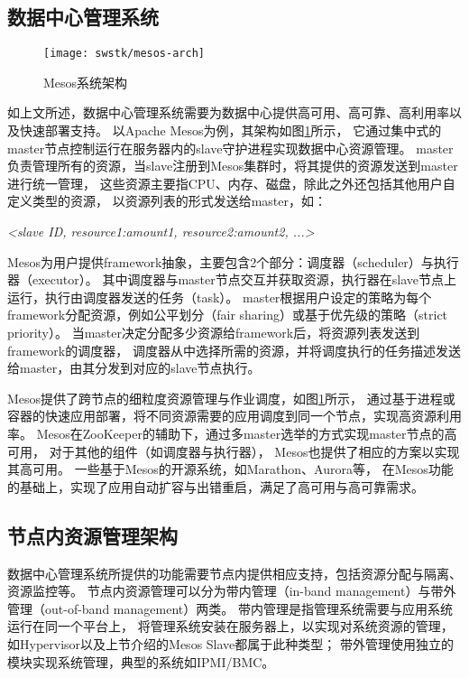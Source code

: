 \subsection{数据中心管理系统}

\begin{figure}[tb]
  \centering
  \texttt{[image: swstk/mesos-arch]}
  \caption{Mesos系统架构}
  \label{fig:mesos-arch}
\end{figure}

如上文所述，数据中心管理系统需要为数据中心提供高可用、高可靠、高利用率以及快速部署支持。
以Apache Mesos\cite{Hindman:2011:Mesos}为例，其架构如图\ref{fig:mesos-arch}所示，
它通过集中式的master节点控制运行在服务器内的slave守护进程实现数据中心资源管理。
master负责管理所有的资源，当slave注册到Mesos集群时，将其提供的资源发送到master进行统一管理，
这些资源主要指CPU、内存、磁盘，除此之外还包括其他用户自定义类型的资源，
以资源列表的形式发送给master，如：

\textit{<slave ID, resource1:amount1, resource2:amount2, ...>}

Mesos为用户提供framework抽象，主要包含2个部分：调度器（scheduler）与执行器（executor）。
其中调度器与master节点交互并获取资源，执行器在slave节点上运行，执行由调度器发送的任务（task）。
master根据用户设定的策略为每个framework分配资源，例如公平划分（fair sharing）或基于优先级的策略（strict priority）。
当master决定分配多少资源给framework后，将资源列表发送到framework的调度器，
调度器从中选择所需的资源，并将调度执行的任务描述发送给master，由其分发到对应的slave节点执行。

Mesos提供了跨节点的细粒度资源管理与作业调度，如图\ref{fig:mesos-arch}所示，
通过基于进程或容器的快速应用部署，将不同资源需要的应用调度到同一个节点，实现高资源利用率。
Mesos在ZooKeeper的辅助下，通过多master选举的方式实现master节点的高可用，
对于其他的组件（如调度器与执行器），
Mesos也提供了相应的方案以实现其高可用\cite{mesos-high-available-framework}。
一些基于Mesos的开源系统，如Marathon\cite{marathon}、Aurora\cite{Aurora}等，
在Mesos功能的基础上，实现了应用自动扩容与出错重启，满足了高可用与高可靠需求。


\subsection{节点内资源管理架构}

数据中心管理系统所提供的功能需要节点内提供相应支持，包括资源分配与隔离、资源监控等。
节点内资源管理可以分为带内管理（in-band management）与带外管理（out-of-band management）两类。
带内管理是指管理系统需要与应用系统运行在同一个平台上，
将管理系统安装在服务器上，以实现对系统资源的管理，
如Hypervisor以及上节介绍的Mesos Slave都属于此种类型；
带外管理使用独立的模块实现系统管理，典型的系统如IPMI/BMC。

